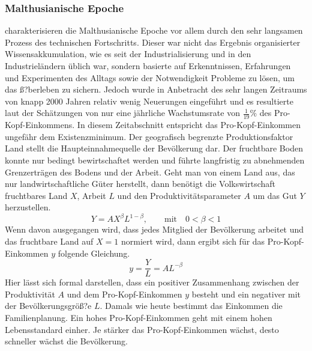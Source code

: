 \subsubsection*{Malthusianische Epoche}
\cite{Ashraf.2011} charakterisieren die Malthusianische Epoche vor allem durch den sehr langsamen Prozess des technischen Fortschritts. Dieser war nicht das Ergebnis organisierter Wissensakkumulation, wie es seit der Industrialisierung und in den Industrie\-ländern üblich war, sondern basierte auf Erkenntnissen, Erfahrungen und Experimenten des Alltags sowie der Notwendigkeit Probleme zu lösen, um das ß?berleben zu sichern. Jedoch wurde in Anbetracht des sehr langen Zeitraums von knapp 2000 Jahren relativ wenig Neuerungen eingeführt und es resultierte laut der Schätzungen von \cite{Maddison.2001} nur eine jährliche Wachstumsrate von $\frac{1}{19}\%$ des Pro-Kopf-Einkommens. In diesem Zeitabschnitt entspricht das Pro-Kopf-Einkommen ungefähr dem Existenzminimum. Der geografisch begrenzte Produktionsfaktor Land stellt die Haupteinnahmequelle der Bevölkerung dar. Der fruchtbare Boden konnte nur bedingt bewirtschaftet werden und führte langfristig zu abnehmenden Grenzerträgen des Bodens und der Arbeit. Geht man von einem Land aus, das nur landwirtschaftliche Güter herstellt, dann benötigt die Volkswirtschaft fruchtbares Land $X$, Arbeit $L$ und den Produktivitätsparameter $A$ um das Gut $Y$ herzustellen.
%
	\begin{equation}
		Y=AX^\beta L^{1-\beta},  \qquad \text{mit}\quad 0< \beta < 1
	\end{equation}
%	
Wenn davon ausgegangen wird, dass jedes Mitglied der Bevölkerung arbeitet und das fruchtbare Land  auf $X=1$ normiert wird, dann ergibt sich für das Pro-Kopf-Einkommen $y$ folgende Gleichung. 
%
	\begin{equation}
		y=\frac{Y}{L}=AL^{-\beta}
	\end{equation}
%
Hier lässt sich formal darstellen, dass ein positiver Zusammenhang zwischen der Produktivität $A$ und dem Pro-Kopf-Einkommen $y$ besteht und ein negativer mit der Bevölkerungsgröß?e $L$. Damals wie heute bestimmt das Einkommen die Familienplanung. Ein hohes Pro-Kopf-Einkommen geht mit einem hohen Lebensstandard einher. Je stärker das Pro-Kopf-Einkommen wächst, desto schneller wächst die Bevölkerung.\\
%

